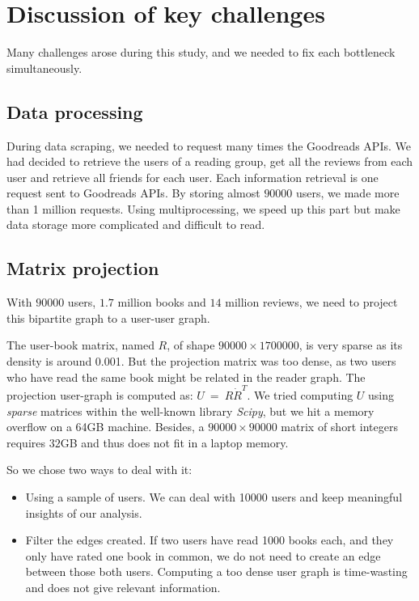 \documentclass[11pt]{article}
\begin{document}
\section{Discussion of key challenges}

Many challenges arose during this study, and we needed to fix each bottleneck simultaneously.

\subsection{Data processing}

During data scraping, we needed to request many times the Goodreads APIs.
We had decided to retrieve the users of a reading group, get all the reviews from each user and retrieve all friends for each user.
Each information retrieval is one request sent to Goodreads APIs.
By storing almost $90000$ users, we made more than 1 million requests. Using multiprocessing, we speed up this part but make data storage more complicated and difficult to read.

\subsection{Matrix projection}

With $90000$ users, $1.7$ million books and $14$ million reviews, we need to project this bipartite graph to a user-user graph.

The user-book matrix, named $R$, of shape $90000 \times 1700000$, is very sparse as its density is around 0.001. But the projection matrix was too dense, as two users who have read the same book might be related in the reader graph.
The projection user-graph is computed as: $U~=~R \dot R^T$.
We tried computing $U$ using \emph{sparse} matrices within the well-known library \emph{Scipy}\cite{scipy}, but we hit a memory overflow on a 64GB machine.
Besides, a $90000 \times 90000$ matrix of short integers requires $32$GB and thus does not fit in a laptop memory.

So we chose two ways to deal with it:
\begin{itemize}
\item Using a sample of users. We can deal with 10000 users and keep meaningful insights of our analysis.
\item Filter the edges created. If two users have read 1000 books each, and they only have rated one book in common, we do not need to create an edge between those both users. Computing a too dense user graph is time-wasting and does not give relevant information.
\end{itemize}
\end{document}
